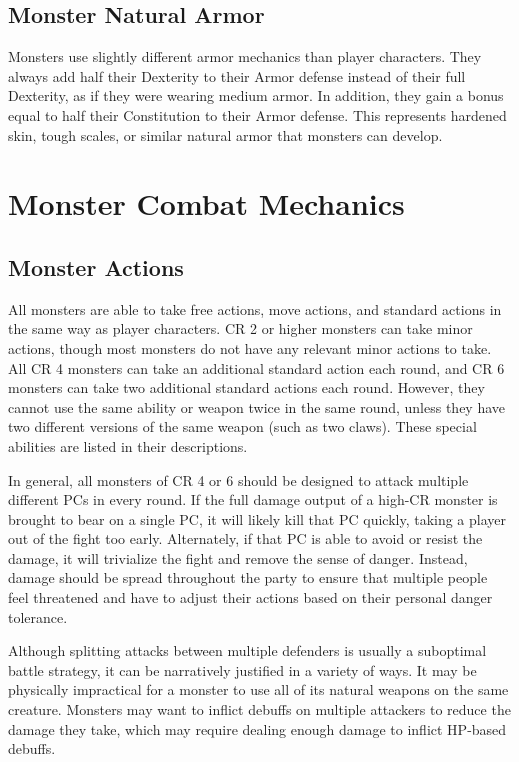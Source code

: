     \subsection{Monster Natural Armor}\label{Monster Natural Armor}
        Monsters use slightly different armor mechanics than player characters.
        They always add half their Dexterity to their Armor defense instead of their full Dexterity, as if they were wearing medium armor.
        In addition, they gain a bonus equal to half their Constitution to their Armor defense.
        This represents hardened skin, tough scales, or similar natural armor that monsters can develop.

\section{Monster Combat Mechanics}

    \subsection{Monster Actions}\label{Monster Actions}
        All monsters are able to take free actions, move actions, and standard actions in the same way as player characters.
        CR 2 or higher monsters can take minor actions, though most monsters do not have any relevant minor actions to take.
        All CR 4 monsters can take an additional standard action each round, and CR 6 monsters can take two additional standard actions each round.
        However, they cannot use the same ability or weapon twice in the same round, unless they have two different versions of the same weapon (such as two claws).
        These special abilities are listed in their descriptions.

        In general, all monsters of CR 4 or 6 should be designed to attack multiple different PCs in every round.
        If the full damage output of a high-CR monster is brought to bear on a single PC, it will likely kill that PC quickly, taking a player out of the fight too early.
        Alternately, if that PC is able to avoid or resist the damage, it will trivialize the fight and remove the sense of danger.
        Instead, damage should be spread throughout the party to ensure that multiple people feel threatened and have to adjust their actions based on their personal danger tolerance.

        Although splitting attacks between multiple defenders is usually a suboptimal battle strategy, it can be narratively justified in a variety of ways.
        It may be physically impractical for a monster to use all of its natural weapons on the same creature.
        Monsters may want to inflict debuffs on multiple attackers to reduce the damage they take, which may require dealing enough damage to inflict HP-based debuffs.


